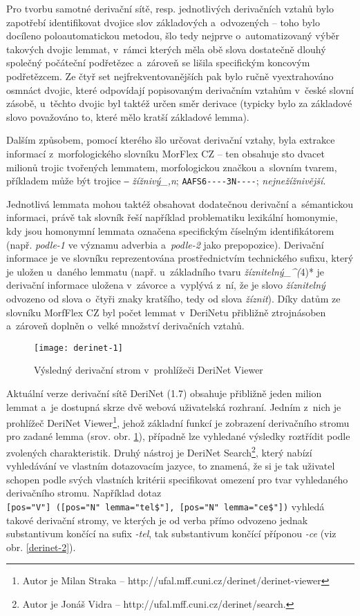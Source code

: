 Pro tvorbu samotné derivační sítě, resp. jednotlivých derivačních vztahů
bylo zapotřebí identifikovat dvojice slov základových a~odvozených --
toho bylo docíleno poloautomatickou metodou, šlo tedy nejprve
o~automatizovaný výběr takových dvojic lemmat, v~rámci kterých měla obě
slova dostatečně dlouhý společný počáteční podřetězec a~zároveň se
lišila specifickým koncovým podřetězcem. Ze čtyř set
nejfrekventovanějších pak bylo ručně vyextrahováno osmnáct dvojic, které
odpovídají popisovaným derivačním vztahům v~české slovní zásobě,
u~těchto dvojic byl taktéž určen směr derivace (typicky bylo za základové
slovo považováno to, které mělo kratší základové lemma).
\parencite{derinet-cz}

Dalším způsobem, pomocí kterého šlo určovat derivační vztahy, byla
extrakce informací z~morfologického slovníku MorFlex CZ -- ten obsahuje
sto dvacet milionů trojic tvořených lemmatem, morfologickou značkou
a~slovním tvarem, příkladem může být trojice ‒ \emph{žížnivý\_,n};
\texttt{AAFS6-\/-\/-\/-3N-\/-\/-\/-}; \emph{nejnežížnivější}.
\parencite{morflex}

Jednotlivá lemmata mohou taktéž obsahovat dodatečnou derivační
a~sémantickou informaci, právě tak slovník řeší například problematiku
lexikální homonymie, kdy jsou homonymní lemmata označena specifickým
číselným identifikátorem (např. \emph{podle-1} ve významu adverbia
a~\emph{podle-2} jako prepopozice). Derivační informace je ve slovníku
reprezentována prostřednictvím technického sufixu, který je uložen
u~daného lemmatu (např. u~základního tvaru \emph{žíznitelný\_\^{}(}4)* je
derivační informace uložena v~závorce a~vyplývá z~ní, že je slovo
\emph{žíznitelný} odvozeno od slova o~čtyři znaky kratšího, tedy od
slova \emph{žíznit}). Díky datům ze slovníku MorfFlex CZ byl počet
lemmat v~DeriNetu přibližně ztrojnásoben a~zároveň doplněn o~velké
množství derivačních vztahů.~\parencite{sevcikova16}

\begin{figure}[ht]   
    \centering
    \texttt{[image: derinet-1]}  
    \caption{Výsledný derivační strom v~prohlížeči DeriNet Viewer~\parencite{derinet}}
    \label{derinet-1}
 \end{figure}

Aktuální verze derivační sítě DeriNet (1.7) obsahuje přibližně jeden
milion lemmat a~je dostupná skrze dvě webová uživatelská rozhraní.
Jedním z~nich je prohlížeč DeriNet
Viewer\footnote{Autor je Milan Straka -- http://ufal.mff.cuni.cz/derinet/derinet-viewer},
jehož základní funkcí je zobrazení derivačního stromu pro zadané lemma
(srov. obr. \ref{derinet-1}), případně lze vyhledané výsledky roztřídit
podle zvolených charakteristik. Druhý nástroj je DeriNet
Search\footnote{Autor je Jonáš Vidra -- http://ufal.mff.cuni.cz/derinet/search.},
který nabízí vyhledávání ve vlastním dotazovacím jazyce, to znamená, že
si je tak uživatel schopen podle svých vlastních kritérii specifikovat
omezení pro tvar vyhledaného derivačního stromu. Například dotaz
\texttt{{[}pos="V"{]}\ ({[}pos="N"\ lemma="tel\$"{]},\ {[}pos="N"\ lemma="ce\$"{]})}
vyhledá takové derivační stromy, ve kterých je od verba přímo odvozeno
jednak substantivum končící na sufix \emph{-tel}, tak substantivum končící příponou \emph{-ce} (viz obr. \ref{derinet-2}).~\parencite{derinet-cz}

